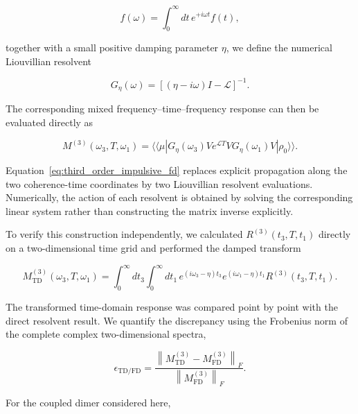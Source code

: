 \documentclass[11pt]{article}
\begin{document}
\begin{equation}
f(\omega)
=
\int_0^\infty dt\,
e^{+i\omega t}f(t),
\end{equation}

together with a small positive damping parameter $\eta$, we define the
numerical Liouvillian resolvent

\begin{equation}
G_\eta(\omega)
=
\left[
(\eta-i\omega)I-\mathcal{L}
\right]^{-1}.
\label{eq:liouvillian_resolvent}
\end{equation}

The corresponding mixed frequency--time--frequency response can then
be evaluated directly as

\begin{equation}
M^{(3)}(\omega_3,T,\omega_1)
=
\langle\!\langle\mu|
G_\eta(\omega_3)
V
e^{\mathcal{L}T}
V
G_\eta(\omega_1)
V
|\rho_0\rangle\!\rangle .
\label{eq:third_order_impulsive_fd}
\end{equation}

Equation~\eqref{eq:third_order_impulsive_fd} replaces explicit
propagation along the two coherence-time coordinates by two
Liouvillian resolvent evaluations.  Numerically, the action of each
resolvent is obtained by solving the corresponding linear system rather
than constructing the matrix inverse explicitly.

To verify this construction independently, we calculated
$R^{(3)}(t_3,T,t_1)$ directly on a two-dimensional time grid and
performed the damped transform

\begin{equation}
M_{\mathrm{TD}}^{(3)}
(\omega_3,T,\omega_1)
=
\int_0^\infty dt_3
\int_0^\infty dt_1\,
e^{(i\omega_3-\eta)t_3}
e^{(i\omega_1-\eta)t_1}
R^{(3)}(t_3,T,t_1).
\label{eq:third_order_td_transform}
\end{equation}

The transformed time-domain response was compared point by point with
the direct resolvent result.  We quantify the discrepancy using the
Frobenius norm of the complete complex two-dimensional spectra,

\begin{equation}
\epsilon_{\mathrm{TD/FD}}
=
\frac{
\left\|
M_{\mathrm{TD}}^{(3)}
-
M_{\mathrm{FD}}^{(3)}
\right\|_F
}{
\left\|
M_{\mathrm{FD}}^{(3)}
\right\|_F
}.
\label{eq:third_order_td_fd_error}
\end{equation}

For the coupled dimer considered here,
\end{document}
